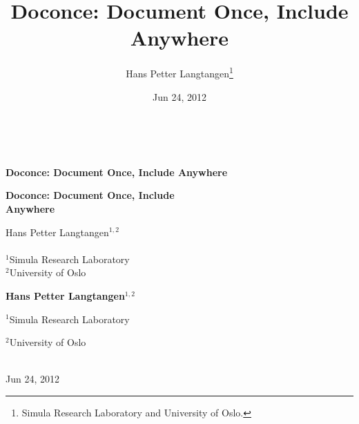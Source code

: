 \documentclass{book}
\begin{document}


\title{Doconce: Document Once, Include Anywhere}


\thispagestyle{empty}
\hbox{\ \ }
\vfill
\begin{center}
{\huge{\bfseries{Doconce: Document Once, Include Anywhere}}}


\begin{center}
{\LARGE\bf Doconce: Document Once, Include \\ [1.5mm] Anywhere}
\end{center}




\author{Hans Petter Langtangen\footnote{Simula Research Laboratory and University of Oslo.}}

\vspace{1.3cm}

{\Large\textsf{Hans Petter Langtangen${}^{1, 2}$}}\\ [3mm]

\ \\ [2mm]

{\large\textsf{${}^1$Simula Research Laboratory} \\ [1.5mm]}
{\large\textsf{${}^2$University of Oslo} \\ [1.5mm]}


\begin{center}
{\bf Hans Petter Langtangen${}^{1, 2}$} \\ [0mm]
\end{center}

\begin{center}
\centerline{{\small ${}^1$Simula Research Laboratory}}
\centerline{{\small ${}^2$University of Oslo}}
\end{center}





\date{Jun 24, 2012}
\maketitle


\ \\ [10mm]
{\large\textsf{Jun 24, 2012}}

\end{center}
\vfill
\clearpage
\end{document}
